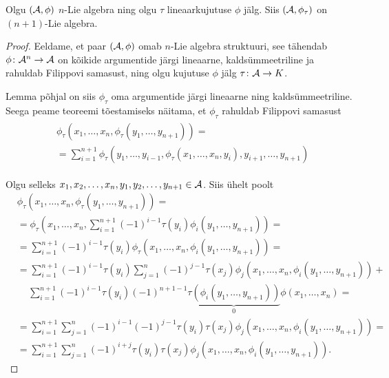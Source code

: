\begin{thm}\label{thm:n+1_lie_alg}
    Olgu $(\mathcal{A}, \phi)$ $n$-Lie algebra ning olgu $\tau$ lineaarkujutuse
    $\phi$ jälg. Siis $(\mathcal{A}, \phi_\tau)$ on $(n+1)$-Lie algebra.
\end{thm}

\begin{proof}
    Eeldame, et paar $(\mathcal{A}, \phi)$ omab $n$-Lie algebra struktuuri,
    see tähendab $\phi \colon \mathcal{A}^n \to \mathcal{A}$ on kõikide argumentide
    järgi lineaarne, kaldsümmeetriline ja rahuldab Filippovi
    samasust, ning olgu kujutuse $\phi$ jälg $\tau \colon \mathcal{A} \to K$.

    Lemma põhjal on siis $\phi_\tau$ oma argumentide järgi lineaarne
    ning kaldsümmeetriline. Seega peame teoreemi tõestamiseks
    näitama, et $\phi_\tau$ rahuldab Filippovi samasust
    \begin{align}\label{eq:n+1_filippov}
        \begin{split}
            &\phi_\tau(x_1, \dots, x_n,
                \phi_\tau(y_1, \dots, y_{n+1})
            ) = \\
            &= \sum_{i=1}^{n+1} \phi_\tau(
                y_1, \dots, y_{i-1},
                \phi_\tau(x_1, \dots, x_n, y_i),
                y_{i+1}, \dots, y_{n+1}
            )
        \end{split}
    \end{align}

    Olgu selleks $x_1, x_2, \dots, x_n, y_1, y_2, \dots, y_{n+1}
    \in \mathcal{A}$. Siis ühelt poolt
    \begin{align*}
        &\phi_\tau(x_1, \dots, x_n,
            \phi_\tau(y_1, \dots, y_{n+1})
        ) = \\
        &= \phi_\tau\left(
             x_1, \dots, x_n,
             \sum_{i=1}^{n+1} (-1)^{i-1} \tau(y_i)
             \phi_i(y_1, \dots, y_{n+1})
           \right) = \\
        &= \sum_{i=1}^{n+1} (-1)^{i-1} \tau(y_i) \phi_\tau\left(
             x_1, \dots, x_n, \phi_i(y_1, \dots, y_{n+1})
           \right) = \\
        &= \sum_{i=1}^{n+1} (-1)^{i-1} \tau(y_i)
           \sum_{j=1}^{n} (-1)^{j-1} \tau(x_j) \phi_j(
             x_1, \dots, x_n, \phi_i(y_1, \dots, y_{n+1})) + \\
        &\quad\, \sum_{i=1}^{n+1} (-1)^{i-1} \tau(y_i) (-1)^{n+1-1}
           \underbrace{
             \tau\left( \phi_i(y_1, \dots, y_{n+1}) \right)
           }_{0} \phi(x_1, \dots, x_n) = \\
        &= \sum_{i=1}^{n+1} \sum_{j=1}^{n} (-1)^{i-1} (-1)^{j-1}
           \tau(y_i) \tau(x_j) \phi_j \left(
             x_1, \dots, x_n, \phi_i(y_1, \dots, y_{n+1})
           \right) = \\
        &= \sum_{i=1}^{n+1} \sum_{j=1}^{n} (-1)^{i+j}
           \tau(y_i) \tau(x_j) \phi_j \left(
             x_1, \dots, x_n, \phi_i(y_1, \dots, y_{n+1})
           \right).
    \end{align*}
\end{proof}


